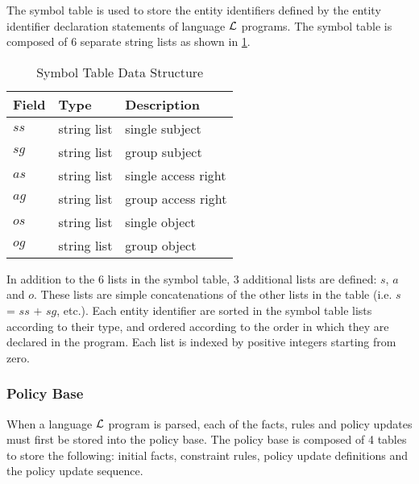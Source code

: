 \documentclass[11pt]{report}
\begin{document}
          The symbol table is used to store the entity identifiers defined by
          the entity identifier declaration statements of language ${\cal L}$
          programs. The symbol table is composed of 6 separate string lists
          as shown in \ref{tabl-polup-stdsr}.

          \begin{table}[tbhp]
            \begin{center}
              \begin{tabular}[t]{|l|l|l|}
                \hline
                \textbf{Field} & \textbf{Type}  & \textbf{Description} \\
                \hline
                $ss$           & string list    & single subject \\
                \hline
                $sg$           & string list    & group subject \\
                \hline
                $as$           & string list    & single access right \\
                \hline
                $ag$           & string list    & group access right \\
                \hline
                $os$           & string list    & single object \\
                \hline
                $og$           & string list    & group object \\
                \hline
              \end{tabular}
            \end{center}
            \caption{Symbol Table Data Structure}
            \label{tabl-polup-stdsr}
          \end{table}

          In addition to the 6 lists in the symbol table, 3 additional lists
          are defined: $s$, $a$ and $o$. These lists are simple concatenations
          of the other lists in the table (i.e. $s$ = $ss$ $+$ $sg$, etc.).
          Each entity identifier are sorted in the symbol table lists
          according to their type, and ordered according to the order in which
          they are declared in the program. Each list is indexed by positive
          integers starting from zero.

        \subsubsection{Policy Base}

          When a language ${\cal L}$ program is parsed, each of the facts,
          rules and policy updates must first be stored into the policy base.
          The policy base is composed of 4 tables to store the following:
          initial facts, constraint rules, policy update definitions and
          the policy update sequence.
\end{document}
